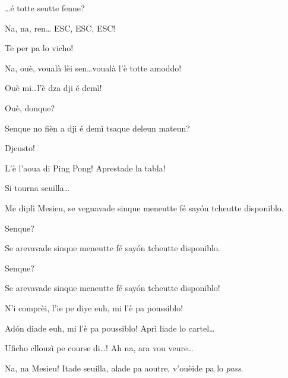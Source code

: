 \begin{drama}
\Treisouspeaks{} \ldots é totte seutte fenne?

\Tuenospeaks Na, na, ren\ldots {} ESC, ESC, ESC!

\Treisouspeaks Te per pa lo vicho!

\Tuenospeaks{} Na, ouè, voualà lèi sen\ldots voualà l'è totte amoddo!


\Treisouspeaks Ouè mi\ldots l'è dza dji é demì!

\Richardspeaks Ouè, donque?

\Treisouspeaks{} Senque no fièn a dji é demì tsaque deleun mateun?

\Tcheuttespeaks Djeusto!

\Treisouspeaks L’è l’aoua di Ping Pong! Aprestade la tabla!
 




\Genespeaks Si tourna seuilla\ldots

\Sandrinospeaks Me diplì Mesieu, se vegnavade sinque meneutte fé say\'on tcheutte disponiblo.

\Genespeaks Senque?

\Sandrinospeaks Se arevavade sinque meneutte fé say\'on tcheutte disponiblo.

\Genespeaks Senque?

\Sandrinospeaks{} Se arevavade sinque meneutte fé say\'on tcheutte disponiblo!

\Genespeaks{} N'i comprèi, l'ie pe diye \og euh, mi l'è pa poussiblo\fg!

\Sandrinospeaks Ad\'on diade \og euh, mi l'è pa poussiblo\fg! Aprì liade lo cartel\ldots

\Genespeaks{} Uficho cllouzì pe course di\ldots! Ah na, ara vou veure\ldots


\Sandrinospeaks Na, na Mesieu! Itade seuilla, alade pa aoutre, v'ouèide pa lo \textit{pass}. 


\end{drama}
